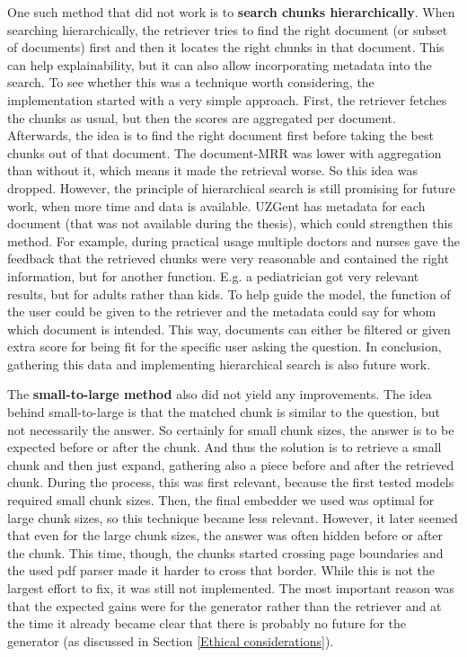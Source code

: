One such method that did not work is to \textbf{search chunks hierarchically}. When searching hierarchically, the retriever tries to find the right document (or subset of documents) first and then it locates the right chunks in that document. This can help explainability, but it can also allow incorporating metadata into the search. To see whether this was a technique worth considering, the implementation started with a very simple approach. First, the retriever fetches the chunks as usual, but then the scores are aggregated per document. Afterwards, the idea is to find the right document first before taking the best chunks out of that document. The document-MRR was lower with aggregation than without it, which means it made the retrieval worse. So this idea was dropped. However, the principle of hierarchical search is still promising for future work, when more time and data is available. UZGent has metadata for each document (that was not available during the thesis), which could strengthen this method. For example, during practical usage multiple doctors and nurses gave the feedback that the retrieved chunks were very reasonable and contained the right information, but for another function. E.g. a pediatrician got very relevant results, but for adults rather than kids. To help guide the model, the function of the user could be given to the retriever and the metadata could say for whom which document is intended. This way, documents can either be filtered or given extra score for being fit for the specific user asking the question. In conclusion, gathering this data and implementing hierarchical search is also future work.

The \textbf{small-to-large method} also did not yield any improvements. The idea behind small-to-large is that the matched chunk is similar to the question, but not necessarily the answer. So certainly for small chunk sizes, the answer is to be expected before or after the chunk. And thus the solution is to retrieve a small chunk and then just expand, gathering also a piece before and after the retrieved chunk. During the process, this was first relevant, because the first tested models required small chunk sizes. Then, the final embedder we used was optimal for large chunk sizes, so this technique became less relevant. However, it later seemed that even for the large chunk sizes, the answer was often hidden before or after the chunk. This time, though, the chunks started crossing page boundaries and the used pdf parser made it harder to cross that border. While this is not the largest effort to fix, it was still not implemented. The most important reason was that the expected gains were for the generator rather than the retriever and at the time it already became clear that there is probably no future for the generator (as discussed in Section \ref{Ethical considerations}).

